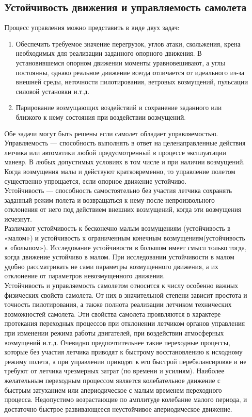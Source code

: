 \documentclass{article}
\begin{document}
\subsection{Устойчивость движения и управляемость самолета}
Процесс управления можно представить в виде двух задач:
\begin{enumerate}
\item Обеспечить требуемое значение перегрузок, углов атаки, скольжения, крена необходимых для реализации заданного опорного движения. В установившемся опорном движении моменты уравновешивают, а углы постоянны, однако реальное движение всегда отличается от идеального из-за внешней среды, неточности пилотирования, ветровых возмущений, пульсации силовой установки и.т.д.

\item Парирование возмущающих воздействий и сохранение заданного или близкого к нему состояния при воздействии возмущений.
\end{enumerate}
Обе задачи могут быть решены если самолет обладает управляемостью. \\
Управляемость --- способность выполнять в ответ на целенаправленные действия летчика или автоматики любой предусмотренный в процессе эксплуатации маневр. В любых допустимых условиях в том числе и при наличии возмущений. Когда возмущения малы и действуют кратковременно, то управление полетом существенно упрощается, если опорное движение устойчиво.\\
Устойчивость --- способность самостоятельно без участия летчика сохранять заданный режим полета и возвращаться к нему после непроизвольного отклонения от него под действием внешних возмущений, когда эти возмущения исчезнут.\\
Различают устойчивость к бесконечно малым возмущениям (устойчивость в «малом») и устойчивость к ограниченным конечным возмущениям(устойчивость в «большом»).
Исследование устойчивости в большом имеет смысл только тогда, когда движение устойчиво в малом. При исследовании устойчивости в малом удобно рассматривать не сами параметры возмущенного движения, а их отклонение от параметров невозмущенного движения.\\
Устойчивость и управляемость самолетом относится к числу особенно важных физических свойств самолета. От них в значительной степени зависит простота и точность пилотирования, а также полнота реализации летчиком технических возможностей самолета. Эти свойства самолета проявляются в характере протекания переходных процессов при отклонении летчиком органов управления при изменении режима работы двигателей, при воздействии атмосферных возмущений и.т.д. Очевидно предпочтительнее такие переходные процессы, которые без участия летчика приводят к быстрому восстановлению к исходному режиму полета, а при управлении приводят к его быстрой перебалансировке и не требуют от летчика чрезмерных затрат (по времени и усилиям). Наиболее желательным переходным процессом является колебательное движение с быстрым затуханием или апериодическое с малым временем переходного процесса. Недопустимо возрастающие по амплитуде колебание малого периода, и достаточно быстрое развивающееся неустойчивое апериодическое движение.\\
\end{document}
